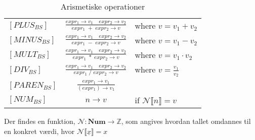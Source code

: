 
\bgroup
\def\arraystretch{3}
\begin{table}[H]
\centering
\begin{tabular}{l c l}
    
    $[PLUS_{BS}]$ &$\frac{expr_1 \rightarrow v_1 \quad expr_2 \rightarrow v_2}{expr_1\;+\;expr_2 \rightarrow v}$ & where $v = v_1 + v_2$ \\
    
    $[MINUS_{BS}]$ &$\frac{expr_1 \rightarrow v_1 \quad expr_2 \rightarrow v_2}{expr_1\;-\;expr_2 \rightarrow v}$ & where $v = v_1 - v_2$ \\
    
    $[MULT_{BS}]$ &$\frac{expr_1 \rightarrow v_1 \quad expr_2 \rightarrow v_2}{expr_1\;*\;expr_2 \rightarrow v}$ & where $v = v_1 \cdot v_2$ \\
    
    $[DIV_{BS}]$ &$\frac{expr_1 \rightarrow v_1 \quad expr_2 \rightarrow v_2}{expr_1\;/\;expr_2 \rightarrow v}$ & where $v = \frac{v_1}{v_2}$ \\
    
    
    $[PAREN_{BS}]$ &$\frac{expr_1 \rightarrow v_1}{(expr_1) \rightarrow v_1}$ & \\
    
    $[NUM_{BS}]$ &$n \rightarrow v$ & if $\mathcal{N}\llbracket n\rrbracket = v$ \\
    
\end{tabular}
\caption{Arismetiske operationer}
\label{tab:arithmetic}
\end{table}
\egroup

Der findes en funktion, $\mathcal{N} : \textbf{Num} \rightarrow \mathbb{Z}$, som angives hvordan tallet omdannes til en konkret værdi, hvor $\mathcal{N}\llbracket \underline{x}\rrbracket = x$

